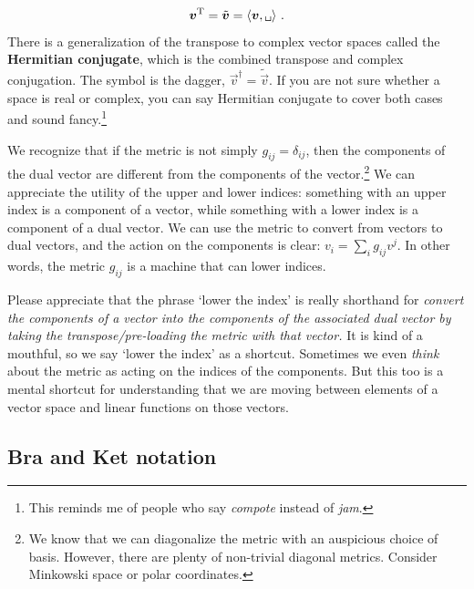 \documentclass[
  11pt,
	colorful,
	raggedright,
]{tufte-style-thesis-flip}
\begin{document}
\begin{align}
  \vec v^\text{T} = \tilde{\vec v} = \langle \vec v , \texttt{\textvisiblespace}\rangle \ .
  \label{eq:transpose:as:inner:product:preloaded}
\end{align}
There is a generalization of the transpose to complex vector spaces called the \textbf{Hermitian conjugate}, which is the combined transpose and complex conjugation. The symbol is the dagger, $\vec{v}^\dag = \tilde{\vec v}$. If you are not sure whether a space is real or complex, you can say Hermitian conjugate to cover both cases and sound fancy.\footnote{This reminds me of people who say \emph{compote} instead of \emph{jam}.}

We recognize that if the metric is not simply $g_{ij} = \delta_{ij}$, then the components of the dual vector are different from the components of the vector.\footnote{We know that we can diagonalize the metric with an auspicious choice of basis. However, there are plenty of non-trivial diagonal metrics. Consider Minkowski space or polar coordinates.} We can appreciate the utility of the upper and lower indices: something with an upper index is a component of a vector, while something with a lower index is a component of a dual vector. We can use the metric to convert from vectors to dual vectors, and the action on the components is clear: $v_i = \sum_i g_{ij}v^j$. In other words, the metric $g_{ij}$ is a machine that can lower indices.

Please appreciate that the phrase `lower the index' is really shorthand for \emph{convert the components of a vector into the components of the associated dual vector by taking the transpose/pre-loading the metric with that vector.} It is kind of a mouthful, so we say `lower the index' as a shortcut. Sometimes we even \emph{think} about the metric as acting on the indices of the components. But this too is a mental shortcut for understanding that we are moving between elements of a vector space and linear functions on those vectors.

\subsection{Bra and Ket notation}
\end{document}
